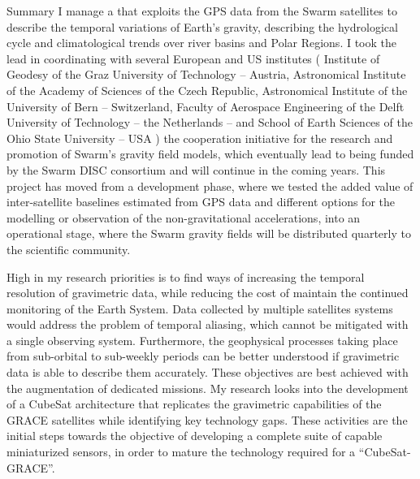 \begin{cvtext}{Summary}
I manage a  that exploits the \ac{GPS} data from the Swarm satellites to describe the temporal variations of Earth's gravity, describing the hydrological cycle and climatological trends over river basins and Polar Regions.
I took the lead in coordinating with several European and US institutes (%
Institute of Geodesy of the Graz University of Technology -- Austria,
Astronomical Institute of the Academy of Sciences of the Czech Republic, 
Astronomical Institute of the University of Bern -- Switzerland, 
Faculty of Aerospace Engineering of the Delft University of Technology -- the Netherlands -- and 
School of Earth Sciences of the Ohio State University -- USA%
) the cooperation initiative for the research and promotion of Swarm's gravity field models, which eventually lead to being funded by the Swarm \ac{DISC} consortium and will continue in the coming years.
This project has moved from a development phase, where we tested the added value of inter-satellite baselines estimated from GPS data and different options for the modelling or observation of the non-gravitational accelerations, into an operational stage, where the Swarm gravity fields will be distributed quarterly to the scientific community.

High in my research priorities is to find ways of increasing the temporal resolution of gravimetric data, while reducing the cost of maintain the continued monitoring of the Earth System.
Data collected by multiple satellites systems would address the problem of temporal aliasing, which cannot be mitigated with a single observing system. 
Furthermore, the geophysical processes taking place from sub-orbital to sub-weekly periods can be better understood if gravimetric data is able to describe them accurately. 
These objectives are best achieved with the augmentation of dedicated missions. 
My research looks into the development of a CubeSat architecture that replicates the gravimetric capabilities of the \ac{GRACE} satellites while identifying key technology gaps. 
These activities are the initial steps towards the objective of developing a complete suite of capable miniaturized sensors, in order to mature the technology required for a \enquote{CubeSat-GRACE}.


\end{cvtext}
